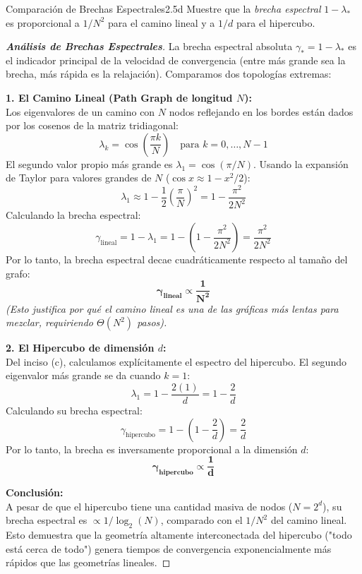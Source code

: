 \documentclass[10pt,a4paper]{article}
\begin{document}
\vspace{5mm}

\begin{ejercicio}{Comparación de Brechas Espectrales}{2.5d}
    Muestre que la \textit{brecha espectral} $1 - \lambda_*$ es proporcional a $1/N^2$ para el camino lineal y a $1/d$ para el hipercubo.
\end{ejercicio}

\vspace{2mm}

\begin{proof}[\textbf{Análisis de Brechas Espectrales}]
    La brecha espectral absoluta $\gamma_* = 1 - \lambda_*$ es el indicador principal de la velocidad de convergencia (entre más grande sea la brecha, más rápida es la relajación). Comparamos dos topologías extremas:

    \textbf{1. El Camino Lineal (Path Graph de longitud $N$):} \\
    Los eigenvalores de un camino con $N$ nodos reflejando en los bordes están dados por los cosenos de la matriz tridiagonal:
    \[ \lambda_k = \cos\left( \frac{\pi k}{N} \right) \quad \text{para } k = 0, \dots, N-1 \]
    El segundo valor propio más grande es $\lambda_1 = \cos(\pi/N)$. Usando la expansión de Taylor para valores grandes de $N$ ($\cos x \approx 1 - x^2/2$):
    \[ \lambda_1 \approx 1 - \frac{1}{2}\left(\frac{\pi}{N}\right)^2 = 1 - \frac{\pi^2}{2N^2} \]
    Calculando la brecha espectral:
    \[ \gamma_{\text{lineal}} = 1 - \lambda_1 = 1 - \left(1 - \frac{\pi^2}{2N^2}\right) = \frac{\pi^2}{2N^2} \]
    Por lo tanto, la brecha espectral decae cuadráticamente respecto al tamaño del grafo:
    \[ \mathbf{\gamma_{\text{lineal}} \propto \frac{1}{N^2}} \]
    \textit{(Esto justifica por qué el camino lineal es una de las gráficas más lentas para mezclar, requiriendo $\Theta(N^2)$ pasos).}

    \vspace{3mm}
    \textbf{2. El Hipercubo de dimensión $d$:} \\
    Del inciso (c), calculamos explícitamente el espectro del hipercubo. El segundo eigenvalor más grande se da cuando $k=1$:
    \[ \lambda_1 = 1 - \frac{2(1)}{d} = 1 - \frac{2}{d} \]
    Calculando su brecha espectral:
    \[ \gamma_{\text{hipercubo}} = 1 - \left( 1 - \frac{2}{d} \right) = \frac{2}{d} \]
    Por lo tanto, la brecha es inversamente proporcional a la dimensión $d$:
    \[ \mathbf{\gamma_{\text{hipercubo}} \propto \frac{1}{d}} \]
    
    \textbf{Conclusión:} \\
    A pesar de que el hipercubo tiene una cantidad masiva de nodos ($N = 2^d$), su brecha espectral es $\propto 1/\log_2(N)$, comparado con el $1/N^2$ del camino lineal. Esto demuestra que la geometría altamente interconectada del hipercubo ("todo está cerca de todo") genera tiempos de convergencia exponencialmente más rápidos que las geometrías lineales.
\end{proof}
\end{document}
